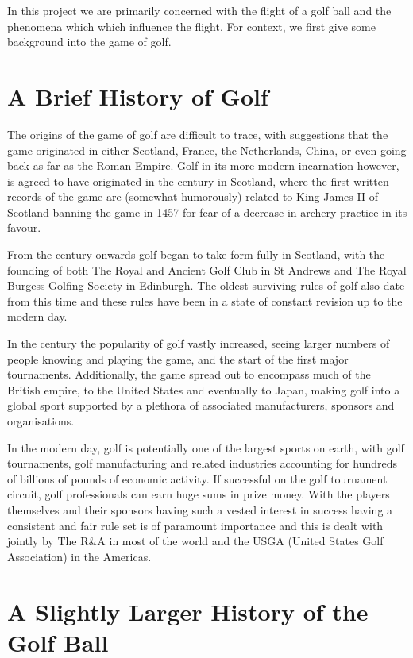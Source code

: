In this project we are primarily concerned with the flight of a golf ball and the phenomena which
which influence the flight. For context, we first give some background into the game of golf.

\section{A Brief History of Golf}

The origins of the game of golf are difficult to trace, with suggestions that the game originated
in either Scotland, France, the Netherlands, China, or even going back as far as the Roman Empire.
Golf in its more modern incarnation however, is agreed to have originated in the  century in
Scotland, where the first written records of the game are (somewhat humorously) related to
King James II of Scotland banning the game in 1457 for fear of a decrease in archery practice
in its favour.

From the  century onwards golf began to take form fully in Scotland, with the founding
of both The Royal and Ancient Golf Club in St Andrews and The Royal Burgess Golfing Society
in Edinburgh. The oldest surviving rules of golf also date from this time and these rules have been
in a state of constant revision up to the modern day.

In the  century the popularity of golf vastly increased, seeing larger numbers of people
knowing and playing the game, and the start of the first major tournaments. Additionally, the
game spread out to encompass much of the British empire, to the United States and eventually to
Japan, making golf into a global sport supported by a plethora of associated manufacturers, sponsors
and organisations.

In the modern day, golf is potentially one of the largest sports on earth, with golf tournaments,
golf manufacturing and related industries accounting for hundreds of billions of pounds of
economic activity. If successful on the golf tournament circuit, golf professionals can earn huge sums
in prize money. With the players themselves and their sponsors having such a vested interest in success
having a consistent and fair rule set is of paramount importance and this is dealt with jointly by 
The R\&A in most of the world and the USGA (United States Golf Association) 
in the Americas.

\section{A Slightly Larger History of the Golf Ball}

